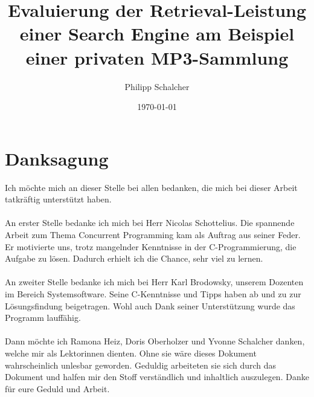 \documentclass[12pt,a4paper,ngerman]{report}
\author{Philipp Schalcher}
\title{Evaluierung der Retrieval-Leistung einer Search Engine am Beispiel einer privaten MP3-Sammlung}
\date{\today}
\begin{document}

\chapter*{Danksagung}
Ich möchte mich an dieser Stelle bei allen bedanken, die mich bei dieser Arbeit tatkräftig unterstützt haben.\\
\\
An erster Stelle bedanke ich mich bei Herr Nicolas Schottelius. Die spannende Arbeit zum Thema Concurrent Programming kam als Auftrag aus seiner Feder. Er motivierte uns, trotz mangelnder Kenntnisse in der C-Programmierung, die Aufgabe zu lösen. Dadurch erhielt ich die Chance, sehr viel zu lernen.\\
\\
An zweiter Stelle bedanke ich mich bei Herr Karl Brodowsky, unserem Dozenten im Bereich Systemsoftware. Seine C-Kenntnisse und Tipps haben ab und zu zur Lösungsfindung beigetragen. Wohl auch Dank seiner Unterstützung wurde das Programm lauffähig.\\
\\
Dann möchte ich Ramona Heiz, Doris Oberholzer und Yvonne Schalcher danken, welche mir als Lektorinnen dienten. Ohne sie wäre dieses Dokument wahrscheinlich unlesbar geworden. Geduldig arbeiteten sie sich durch das Dokument und halfen mir den Stoff verständlich und inhaltlich auszulegen. Danke für eure Geduld und Arbeit.
\tableofcontents
\end{document}
